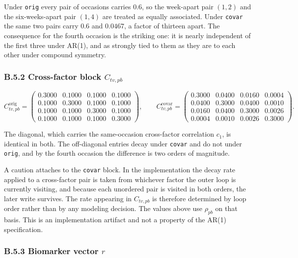 \documentclass[
  11pt,
]{article}
\begin{document}
Under \texttt{orig} every pair of occasions carries \(0.6\), so the
week-apart pair \((1,2)\) and the six-weeks-apart pair \((1,4)\) are
treated as equally associated. Under \texttt{covar} the same two pairs
carry \(0.6\) and \(0.0467\), a factor of thirteen apart. The consequence
for the fourth occasion is the striking one: it is nearly independent
of the first three under AR(1), and as strongly tied to them as they
are to each other under compound symmetry.

\subsubsection{B.5.2 Cross-factor block $C_{tv,pb}$}

\[
C_{tv,pb}^{\text{orig}} =
\begin{pmatrix}
0.3000 & 0.1000 & 0.1000 & 0.1000 \\
0.1000 & 0.3000 & 0.1000 & 0.1000 \\
0.1000 & 0.1000 & 0.3000 & 0.1000 \\
0.1000 & 0.1000 & 0.1000 & 0.3000
\end{pmatrix},
\qquad
C_{tv,pb}^{\text{covar}} =
\begin{pmatrix}
0.3000 & 0.0400 & 0.0160 & 0.0004 \\
0.0400 & 0.3000 & 0.0400 & 0.0010 \\
0.0160 & 0.0400 & 0.3000 & 0.0026 \\
0.0004 & 0.0010 & 0.0026 & 0.3000
\end{pmatrix}.
\]

The diagonal, which carries the same-occasion cross-factor
correlation \(c_1\), is identical in both. The off-diagonal entries
decay under \texttt{covar} and do not under \texttt{orig}, and by the
fourth occasion the difference is two orders of magnitude.

A caution attaches to the \texttt{covar} block. In the implementation
the decay rate applied to a cross-factor pair is taken from whichever
factor the outer loop is currently visiting, and because each
unordered pair is visited in both orders, the later write survives.
The rate appearing in \(C_{tv,pb}\) is therefore determined by loop
order rather than by any modeling decision. The values above use
\(\rho_{pb}\) on that basis. This is an implementation artifact and not
a property of the AR(1) specification.

\subsubsection{B.5.3 Biomarker vector $r$}
\end{document}
